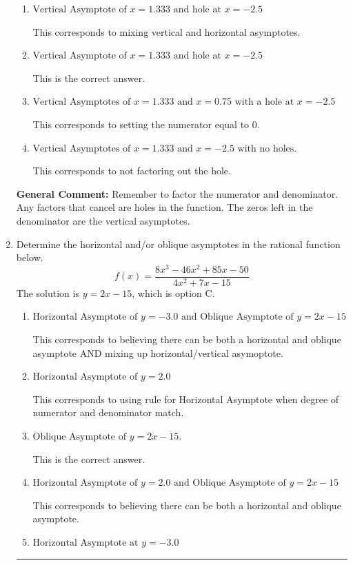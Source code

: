 \documentclass{extbook}[14pt]
\newcommand{\litem}[1]{\item #1

\rule{\textwidth}{0.4pt}}
\begin{document}
\begin{enumerate}
{\begin{enumerate}[label=\Alph*.]
This corresponds to considering where the denominator is equal to 0 as holes.
\item \( \text{Vertical Asymptote of } x = 1.333 \text{ and hole at } x = -2.5 \)

This corresponds to mixing vertical and horizontal asymptotes.
\item \( \text{Vertical Asymptote of } x = 1.333 \text{ and hole at } x = -2.5 \)

This is the correct answer.
\item \( \text{Vertical Asymptotes of } x = 1.333 \text{ and } x = 0.75 \text{ with a hole at } x = -2.5 \)

This corresponds to setting the numerator equal to 0.
\item \( \text{Vertical Asymptotes of } x = 1.333 \text{ and } x = -2.5 \text{ with no holes.} \)

This corresponds to not factoring out the hole.
\end{enumerate}

\textbf{General Comment:} Remember to factor the numerator and denominator. Any factors that cancel are holes in the function. The zeros left in the denominator are the vertical asymptotes.
}
\litem{
Determine the horizontal and/or oblique asymptotes in the rational function below.
\[ f(x) = \frac{8x^{3} -46 x^{2} +85 x -50}{4x^{2} +7 x -15} \]The solution is \( y = 2x -15 \), which is option C.\begin{enumerate}[label=\Alph*.]
\item \( \text{Horizontal Asymptote of } y = -3.0 \text{ and Oblique Asymptote of } y = 2x -15 \)

This corresponds to believing there can be both a horizontal and oblique asymptote AND mixing up horizontal/vertical asymoptote.
\item \( \text{Horizontal Asymptote of } y = 2.0  \)

This corresponds to using rule for Horizontal Asymptote when degree of numerator and denominator match.
\item \( \text{Oblique Asymptote of } y = 2x -15. \)

This is the correct answer.
\item \( \text{Horizontal Asymptote of } y = 2.0 \text{ and Oblique Asymptote of } y = 2x -15 \)

This corresponds to believing there can be both a horizontal and oblique asymptote.
\item \( \text{Horizontal Asymptote at } y = -3.0 \)


\end{enumerate}}
\end{enumerate}
\end{document}
